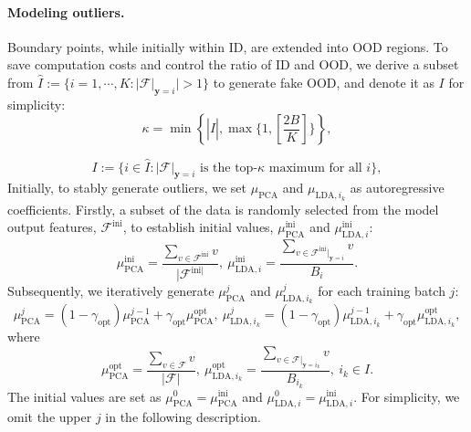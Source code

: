 \documentclass{article}
\theoremstyle{plain}
\theoremstyle{definition}
\theoremstyle{remark}
\begin{document}
\paragraph{Modeling outliers.}

Boundary points, while initially within ID, are extended into OOD regions. 
To save computation costs and control the ratio of ID and OOD, we derive a subset from $\hat{I}:=\{i=1,\cdots, K:|\mathcal{F}|_{\mathbf{y}=i}|>1\}$ to generate fake OOD, and denote it as $I$ for simplicity:
\begin{equation}
    \kappa = \min \left\{|\hat{I}|, \max\bigl\{1,[\frac{2B}{K}]\bigr\}\right\},
    \label{eq: kappa}
\end{equation}

\begin{equation}
    I := \{i\in \hat{I}: |\mathcal{F}|_{\mathbf{y}=i} \text{ is the top-$\kappa$ maximum for all } i \},
    \label{eq: I1}
\end{equation}
%
Initially, to stably generate outliers, we set $\mu_{\text{PCA}}$ and $\mu_{\text{LDA}, i_k}$ as autoregressive coefficients. Firstly, a subset of the data is randomly selected from the model output features, $\mathcal{F}^{\text{ini}}$, to establish initial values, $\mu^{\text{ini}}_{\text{PCA}}$ and $\mu^{\text{ini}}_{\text{LDA}, i}$:
\begin{equation}
    \mu^{\text{ini}}_{\text{PCA}} = \frac{\sum_{v \in \mathcal{F}^{\text{ini}}} v}{|\mathcal{F}^{\text{ini}|}},~ \mu^{\text{ini}}_{\text{LDA}, i} = \frac{\sum_{v \in \mathcal{F}^{\text{ini}} |_{\mathbf{y}=i}} v}{B_{i}}.
\end{equation}
%
Subsequently, we iteratively generate $\mu^j_{\text{PCA}}$ and $\mu^j_{\text{LDA}, i_k}$ for each training batch $j$:
\begin{equation}
    \mu^j_{\text{PCA}} = (1-\gamma_{\text{opt}})\mu^{j-1}_{\text{PCA}} + \gamma_{\text{opt}}\mu^{\text{opt}}_{\text{PCA}},~ \mu^j_{\text{LDA}, i_k} = (1-\gamma_{\text{opt}})\mu^{j-1}_{\text{LDA}, i_k} + \gamma_{\text{opt}}\mu^{\text{opt}}_{\text{LDA}, i_k}, 
\end{equation}
where
\begin{equation}
    \mu^{\text{opt}}_{\text{PCA}} = \frac{\sum_{v \in \mathcal{F}} v}{|\mathcal{F}|},~ \mu^{\text{opt}}_{\text{LDA}, i_k} = \frac{\sum_{v \in \mathcal{F} |_{\mathbf{y}=i_k}} v}{B_{i_k}},~i_k\in I.
\end{equation}
The initial values are set as $\mu^0_{\text{PCA}} = \mu^{\text{ini}}_{\text{PCA}}$ and $\mu^0_{\text{LDA}, i} = \mu^{\text{ini}}_{\text{LDA}, i}$. For simplicity, we omit the upper $j$ in the following description.
\end{document}
